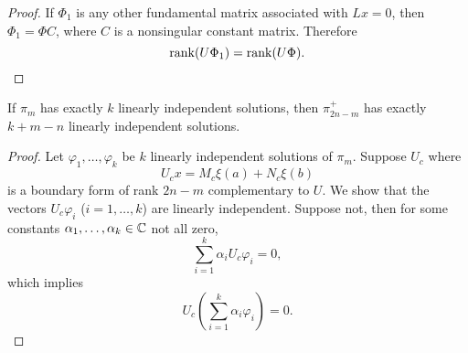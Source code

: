 \documentclass[11pt, oneside, a4paper]{article}
\begin{document}
\begin{proof}
    If $\Phi_1$ is any other fundamental matrix associated with $Lx=0$, then $\Phi_1=\Phi C$, where $C$ is a nonsingular constant matrix. Therefore
    \[\operatorname{rank}(U\Phi_1)=\operatorname{rank}(U\Phi).\]
\end{proof}

\begin{thm}\label{thm:exactly k l.i.d solutions implies exactly k+m-n l.i.d solutions}
    If $\pi_m$ has exactly $k$ linearly independent solutions, then $\pi_{2n-m}^+$ has exactly $k+m-n$ linearly independent solutions.
\end{thm}
\begin{proof}
    Let $\varphi_1,\ldots,\varphi_k$ be $k$ linearly independent solutions of $\pi_m$. Suppose $U_c$ where
    \[U_c x = M_c\xi(a) + N_c\xi(b)\]
    is a boundary form of rank $2n-m$ complementary to $U$. We show that the vectors $U_c \varphi_i$ ($i=1,\ldots,k$) are linearly independent. Suppose not, then for some constants $\alpha_1,\ldots,\alpha_k\in\mathbb C$ not all zero,
    \[\sum_{i=1}^k \alpha_i U_c\varphi_i=0,\]
    which implies
    \[U_c\left(\sum_{i=1}^k \alpha_i\varphi_i\right)=0.\]
\end{proof}
\end{document}
